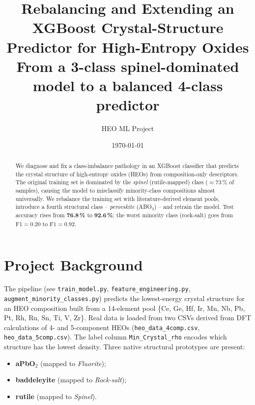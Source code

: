 \documentclass[11pt]{article}
\title{\textbf{Rebalancing and Extending an XGBoost Crystal-Structure
Predictor for High-Entropy Oxides} \\
\large From a 3-class spinel-dominated model to a balanced 4-class predictor}
\author{HEO ML Project}
\date{\today}
\begin{document}
\maketitle

\begin{abstract}
We diagnose and fix a class-imbalance pathology in an XGBoost classifier that
predicts the crystal structure of high-entropy oxides (HEOs) from
composition-only descriptors. The original training set is dominated by the
\emph{spinel} (rutile-mapped) class ($\approx$73\,\% of samples), causing the
model to misclassify minority-class compositions almost universally. We
rebalance the training set with literature-derived element pools, introduce a
fourth structural class -- \emph{perovskite} (ABO$_3$) -- and retrain the
model. Test accuracy rises from \textbf{76.8\,\%} to \textbf{92.6\,\%}; the
worst minority class (rock-salt) goes from F1$=0.20$ to F1$=0.92$.
\end{abstract}

\section{Project Background}
\label{sec:background}

The pipeline (see \texttt{train\_model.py}, \texttt{feature\_engineering.py},
\texttt{augment\_minority\_classes.py}) predicts the lowest-energy crystal
structure for an HEO composition built from a 14-element pool
\{Ce, Ge, Hf, Ir, Mn, Nb, Pb, Pt, Rh, Ru, Sn, Ti, V, Zr\}. Real data is loaded
from two CSVs derived from DFT calculations of 4- and 5-component HEOs
(\texttt{heo\_data\_4comp.csv}, \texttt{heo\_data\_5comp.csv}). The label
column \texttt{Min\_Crystal\_rho} encodes which structure has the lowest
density. Three native structural prototypes are present:
\begin{itemize}
  \item \textbf{aPbO$_2$} (mapped to \emph{Fluorite});
  \item \textbf{baddeleyite} (mapped to \emph{Rock-salt});
  \item \textbf{rutile} (mapped to \emph{Spinel}).
\end{itemize}
\end{document}
